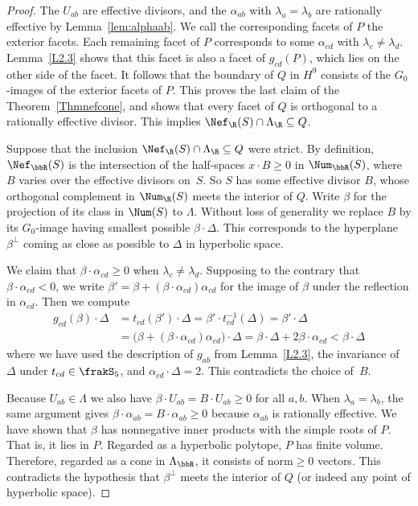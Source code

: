 \begin{proof}
The $U_{ab}$ are effective divisors, and the $\alpha_{ab}$ with $\lambda_a=\lambda_b$ are rationally effective by Lemma~\ref{lem:alphaab}. We call the corresponding facets of $P$ the exterior facets. Each remaining facet of $P$ corresponds to some $\alpha_{cd}$ with $\lambda_c\neq\lambda_d$. Lemma~\ref{L2.3} shows that this facet is also a facet of $g_{cd}(P)$, which lies on the other side of the facet. It follows that the boundary of $Q$ in $H^9$ consists of the $G_0$-images of the exterior facets of $P$. This proves the last claim of the Theorem~\ref{Thmnefcone}, and shows that every facet of $Q$ is orthogonal to a rationally effective divisor. This implies $\Nef_\R(S)\cap\Lambda_\R\subseteq Q$.

Suppose that the inclusion $\Nef_\R(S)\cap\Lambda_\R\subseteq Q$ were strict. By definition, $\Nef_\bbR(S)$ is the intersection of the half-spaces $x\cdot B\geq0$ in $\Num_\bbR(S)$, where $B$ varies over the effective divisors on~$S$. So $S$ has some effective divisor $B$, whose orthogonal complement in $\Num_\R(S)$ meets the interior of $Q$. Write $\beta$ for the projection of its class in $\Num(S)$ to $\Lambda$. Without loss of generality we replace $B$ by its $G_0$-image having smallest possible $\beta\cdot\Delta$. This corresponds to the hyperplane $\beta^\perp$ coming as close as possible to $\Delta$ in hyperbolic space.

We claim that $\beta\cdot\alpha_{cd}\geq0$ when $\lambda_c\neq\lambda_d$. Supposing to the contrary that $\beta\cdot\alpha_{cd}<0$, we write $\beta'=\beta+(\beta\cdot\alpha_{cd})\alpha_{cd}$ for the image of $\beta$ under the reflection in $\alpha_{cd}$. Then we compute
\begin{align*}
g_{cd}(\beta)\cdot\Delta &{}= t_{cd}(\beta')\cdot\Delta =
\beta'\cdot t_{cd}^{-1}(\Delta) =
\beta'\cdot\Delta
\\
{}&=
\bigl(\beta+(\beta\cdot\alpha_{cd})\alpha_{cd}\bigr)\cdot\Delta =
\beta\cdot\Delta+2\beta\cdot\alpha_{cd} <\beta\cdot\Delta
\end{align*}
where we have used the description of $g_{ab}$ from Lemma~\ref{L2.3}, the invariance of $\Delta$ under $t_{cd}\in\frakS_5$, and $\alpha_{cd}\cdot\Delta=2$. This contradicts the choice of~$B$.

Because $U_{ab}\in\Lambda$ we also have $\beta\cdot U_{ab}=B\cdot U_{ab}\geq0$ for all $a,b$. When $\lambda_a=\lambda_b$, the same argument gives $\beta\cdot\alpha_{ab}=B\cdot\alpha_{ab}\geq0$ because $\alpha_{ab}$ is rationally effective. We have shown that $\beta$ has nonnegative inner products with the simple roots of $P$. That is, it lies in $P$. Regarded as a hyperbolic polytope, $P$ has finite volume. Therefore, regarded as a cone in $\Lambda_\bbR$, it consists of norm${ }\geq0$ vectors. This contradicts the hypothesis that $\beta^\perp$ meets the interior of $Q$ (or indeed any point of hyperbolic space).
\end{proof}


